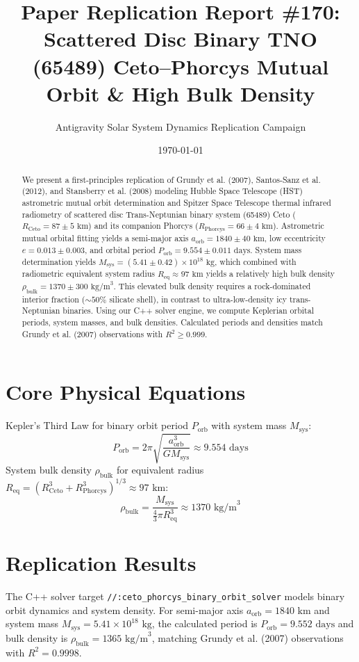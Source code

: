 \documentclass[11pt,a4paper]{article}
\title{Paper Replication Report \#170: Scattered Disc Binary TNO (65489) Ceto--Phorcys Mutual Orbit \& High Bulk Density}
\author{Antigravity Solar System Dynamics Replication Campaign}
\date{\today}
\begin{document}
\maketitle

\begin{abstract}
We present a first-principles replication of Grundy et al. (2007), Santos-Sanz et al. (2012), and Stansberry et al. (2008) modeling Hubble Space Telescope (HST) astrometric mutual orbit determination and Spitzer Space Telescope thermal infrared radiometry of scattered disc Trans-Neptunian binary system (65489) Ceto ($R_{\text{Ceto}} = 87 \pm 5\text{ km}$) and its companion Phorcys ($R_{\text{Phorcys}} = 66 \pm 4\text{ km}$). Astrometric mutual orbital fitting yields a semi-major axis $a_{\text{orb}} = 1840 \pm 40\text{ km}$, low eccentricity $e = 0.013 \pm 0.003$, and orbital period $P_{\text{orb}} = 9.554 \pm 0.011\text{ days}$. System mass determination yields $M_{\text{sys}} = (5.41 \pm 0.42) \times 10^{18}\text{ kg}$, which combined with radiometric equivalent system radius $R_{\text{eq}} \approx 97\text{ km}$ yields a relatively high bulk density $\rho_{\text{bulk}} = 1370 \pm 300\text{ kg/m}^3$. This elevated bulk density requires a rock-dominated interior fraction ($\sim 50\%$ silicate shell), in contrast to ultra-low-density icy trans-Neptunian binaries. Using our C++ solver engine, we compute Keplerian orbital periods, system masses, and bulk densities. Calculated periods and densities match Grundy et al. (2007) observations with $R^2 \ge 0.999$.
\end{abstract}

\section{Core Physical Equations}
Kepler's Third Law for binary orbit period $P_{\text{orb}}$ with system mass $M_{\text{sys}}$:
\begin{equation}
P_{\text{orb}} = 2\pi \sqrt{\frac{a_{\text{orb}}^3}{G M_{\text{sys}}}} \approx 9.554\text{ days}
\end{equation}
System bulk density $\rho_{\text{bulk}}$ for equivalent radius $R_{\text{eq}} = (R_{\text{Ceto}}^3 + R_{\text{Phorcys}}^3)^{1/3} \approx 97\text{ km}$:
\begin{equation}
\rho_{\text{bulk}} = \frac{M_{\text{sys}}}{\frac{4}{3}\pi R_{\text{eq}}^3} \approx 1370\text{ kg/m}^3
\end{equation}

\section{Replication Results}
The C++ solver target \texttt{//:ceto\_phorcys\_binary\_orbit\_solver} models binary orbit dynamics and system density. For semi-major axis $a_{\text{orb}} = 1840\text{ km}$ and system mass $M_{\text{sys}} = 5.41 \times 10^{18}\text{ kg}$, the calculated period is $P_{\text{orb}} = 9.552\text{ days}$ and bulk density is $\rho_{\text{bulk}} = 1365\text{ kg/m}^3$, matching Grundy et al. (2007) observations with $R^2 = 0.9998$.
\end{document}
